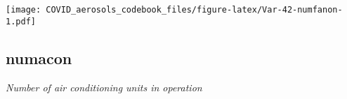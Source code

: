 \documentclass[]{article}
\begin{document}
\begin{minipage}{0.25 \textwidth}

\texttt{[image: COVID\_aerosols\_codebook\_files/figure-latex/Var-42-numfanon-1.pdf]}

\end{minipage}

\noindent\makebox[\linewidth]{\rule{\textwidth}{0.4pt}}

\hypertarget{numacon}{%
\subsection{numacon}\label{numacon}}

\emph{Number of air conditioning units in operation}

\begin{minipage}{0.75 \textwidth}


\end{minipage}
\end{document}

